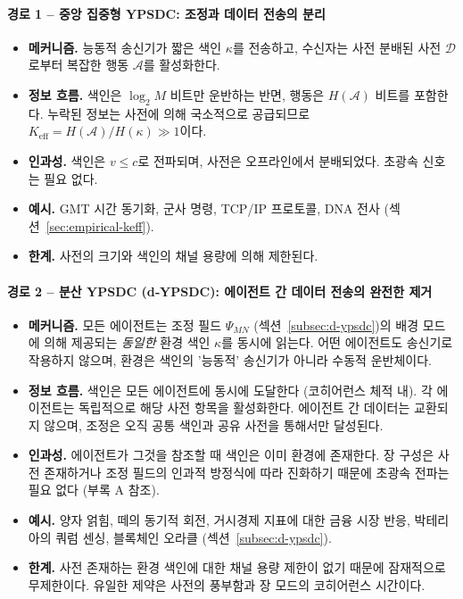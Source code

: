 \documentclass[11pt,a4paper]{article}
\begin{document}
\paragraph*{경로 1 – 중앙 집중형 YPSDC: 조정과 데이터 전송의 분리}
\begin{itemize}[leftmargin=*]
	\item \textbf{메커니즘.} 능동적 송신기가 짧은 색인 $\kappa$를 전송하고, 수신자는 사전 분배된 사전 $\mathcal{D}$로부터 복잡한 행동 $\mathcal{A}$를 활성화한다.
	\item \textbf{정보 흐름.} 색인은 $\log_2 M$ 비트만 운반하는 반면, 행동은 $H(\mathcal{A})$ 비트를 포함한다. 누락된 정보는 사전에 의해 국소적으로 공급되므로 $K_{\mathrm{eff}} = H(\mathcal{A}) / H(\kappa) \gg 1$이다.
	\item \textbf{인과성.} 색인은 $v \le c$로 전파되며, 사전은 오프라인에서 분배되었다. 초광속 신호는 필요 없다.
	\item \textbf{예시.} GMT 시간 동기화, 군사 명령, TCP/IP 프로토콜, DNA 전사 (섹션~\ref{sec:empirical-keff}).
	\item \textbf{한계.} 사전의 크기와 색인의 채널 용량에 의해 제한된다.
\end{itemize}

\paragraph*{경로 2 – 분산 YPSDC (d‑YPSDC): 에이전트 간 데이터 전송의 완전한 제거}
\begin{itemize}[leftmargin=*]
	\item \textbf{메커니즘.} 모든 에이전트는 조정 필드 $\Psi_{MN}$ (섹션~\ref{subsec:d-ypsdc})의 배경 모드에 의해 제공되는 \emph{동일한} 환경 색인 $\kappa$를 동시에 읽는다. 어떤 에이전트도 송신기로 작용하지 않으며, 환경은 색인의 '능동적' 송신기가 아니라 수동적 운반체이다.
	\item \textbf{정보 흐름.} 색인은 모든 에이전트에 동시에 도달한다 (코히어런스 체적 내). 각 에이전트는 독립적으로 해당 사전 항목을 활성화한다. 에이전트 간 데이터는 교환되지 않으며, 조정은 오직 공통 색인과 공유 사전을 통해서만 달성된다.
	\item \textbf{인과성.} 에이전트가 그것을 참조할 때 색인은 이미 환경에 존재한다. 장 구성은 사전 존재하거나 조정 필드의 인과적 방정식에 따라 진화하기 때문에 초광속 전파는 필요 없다 (부록 A 참조).
	\item \textbf{예시.} 양자 얽힘, 떼의 동기적 회전, 거시경제 지표에 대한 금융 시장 반응, 박테리아의 쿼럼 센싱, 블록체인 오라클 (섹션~\ref{subsec:d-ypsdc}).
	\item \textbf{한계.} 사전 존재하는 환경 색인에 대한 채널 용량 제한이 없기 때문에 잠재적으로 무제한이다. 유일한 제약은 사전의 풍부함과 장 모드의 코히어런스 시간이다.
\end{itemize}
\end{document}
